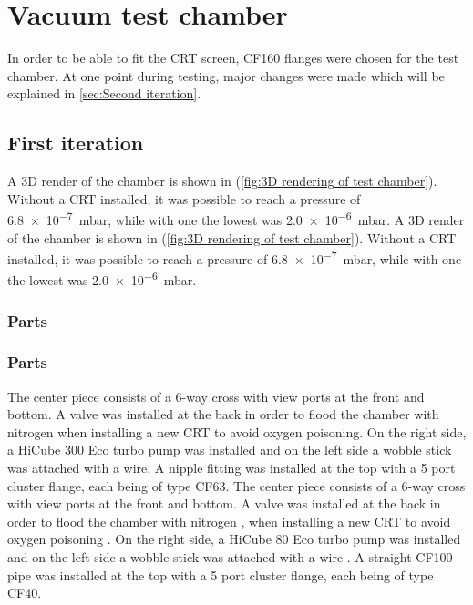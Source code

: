
\chapter{Vacuum test chamber}
\label{ch:Vacuum chamber}

In order to be able to fit the CRT screen, CF160 flanges were chosen for the test chamber. At one point during testing, major changes were made which will be explained in \cref{sec:Second iteration}.

\section{First iteration}
\label{sec:vacuum chamber first iteration}

A 3D render of the chamber is shown in  (\cref{fig:3D rendering of test chamber}). Without a CRT installed, it was possible to reach a pressure of \SI{6.8e-7}{\milli\bar}, while with one the lowest was \SI{2.0e-6}{\milli\bar}.
A 3D render of the chamber is shown in  (\cref{fig:3D rendering of test chamber}). Without a CRT installed, it was possible to reach a pressure of \SI{6.8e-7}{\milli\bar}, while with one the lowest was \SI{2.0e-6}{\milli\bar}. 
 
\subsection{Parts}
\subsection{Parts} 
\label{subsec:Parts}
 
The center piece consists of a 6-way cross with view ports at the front and bottom. A valve was installed at the back in order to flood the chamber with nitrogen when installing a new CRT to avoid oxygen poisoning. On the right side, a HiCube 300 Eco turbo pump was installed and on the left side a wobble stick was attached with a wire. A nipple fitting  was installed at the top with a 5 port cluster flange, each being of type CF63.
The center piece consists of a 6-way cross with view ports at the front and bottom. A valve was installed at the back in order to flood the chamber with nitrogen , when installing a new CRT to avoid oxygen poisoning . On the right side, a HiCube 80 Eco turbo pump was installed and on the left side a wobble stick was attached with a wire . A straight CF100 pipe  was installed at the top with a 5 port cluster flange, each being of type CF40.
 
